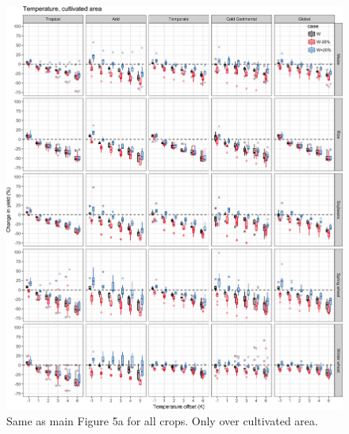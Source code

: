\documentclass[10pt]{article}
\begin{document}
\begin{figure}[h!]
    \centering
    \includegraphics[width=\textwidth]{s_sim_CG_T_area.png}
    \caption{Same as main Figure 5a for all crops. Only over cultivated area.}
    \label{fig:temperautre}
\end{figure}
\end{document}
